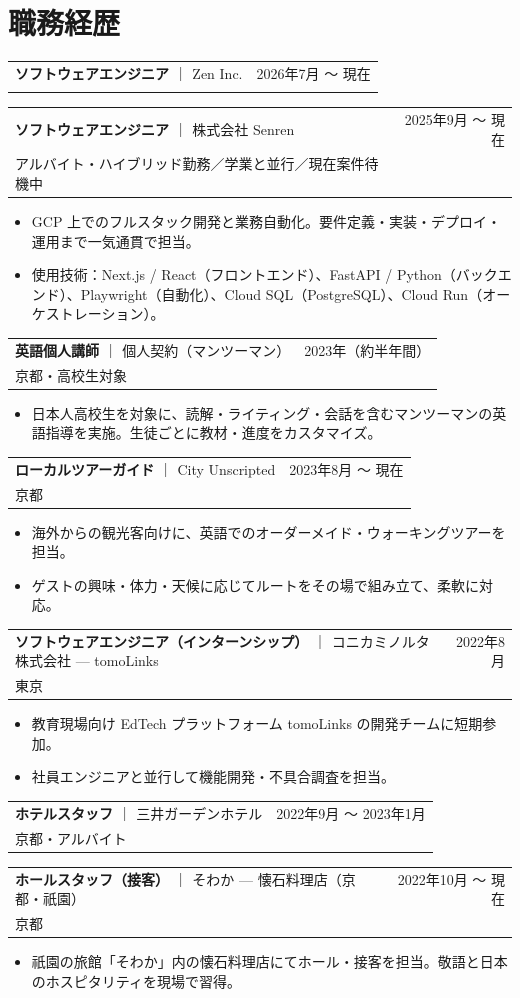 \documentclass[11pt,a4paper]{article}
\makeatletter
\newcommand{\role}[4]{%
  \noindent
  \begin{tabular*}{\linewidth}{@{\extracolsep{\fill}}l r}
    \textbf{#1} \textcolor{muted}{｜} #2 & \textcolor{muted}{#3}\\[-1pt]
    \textcolor{muted}{\small #4} &
  \end{tabular*}\par\vspace{-2pt}
}
\newenvironment{bullets}
  {\begin{itemize}[leftmargin=1.1em, itemsep=1pt, parsep=0pt, topsep=2pt]}
  {\end{itemize}}
\makeatother
\begin{document}
\section{職務経歴}

\role
  {ソフトウェアエンジニア}
  {Zen Inc.}
  {2026年7月 〜 現在}
  {}

\role
  {ソフトウェアエンジニア}
  {株式会社 Senren}
  {2025年9月 〜 現在}
  {アルバイト・ハイブリッド勤務／学業と並行／現在案件待機中}
\begin{bullets}
  \item GCP 上でのフルスタック開発と業務自動化。要件定義・実装・デプロイ・運用まで一気通貫で担当。
  \item 使用技術：Next.js / React（フロントエンド）、FastAPI / Python（バックエンド）、Playwright（自動化）、Cloud SQL（PostgreSQL）、Cloud Run（オーケストレーション）。
\end{bullets}

\role
  {英語個人講師}
  {個人契約（マンツーマン）}
  {2023年（約半年間）}
  {京都・高校生対象}
\begin{bullets}
  \item 日本人高校生を対象に、読解・ライティング・会話を含むマンツーマンの英語指導を実施。生徒ごとに教材・進度をカスタマイズ。
\end{bullets}

\role
  {ローカルツアーガイド}
  {City Unscripted}
  {2023年8月 〜 現在}
  {京都}
\begin{bullets}
  \item 海外からの観光客向けに、英語でのオーダーメイド・ウォーキングツアーを担当。
  \item ゲストの興味・体力・天候に応じてルートをその場で組み立て、柔軟に対応。
\end{bullets}

\role
  {ソフトウェアエンジニア（インターンシップ）}
  {コニカミノルタ株式会社 — tomoLinks}
  {2022年8月}
  {東京}
\begin{bullets}
  \item 教育現場向け EdTech プラットフォーム tomoLinks の開発チームに短期参加。
  \item 社員エンジニアと並行して機能開発・不具合調査を担当。
\end{bullets}

\role
  {ホテルスタッフ}
  {三井ガーデンホテル}
  {2022年9月 〜 2023年1月}
  {京都・アルバイト}

\role
  {ホールスタッフ（接客）}
  {そわか — 懐石料理店（京都・祇園）}
  {2022年10月 〜 現在}
  {京都}
\begin{bullets}
  \item 祇園の旅館「そわか」内の懐石料理店にてホール・接客を担当。敬語と日本のホスピタリティを現場で習得。
\end{bullets}
\end{document}

